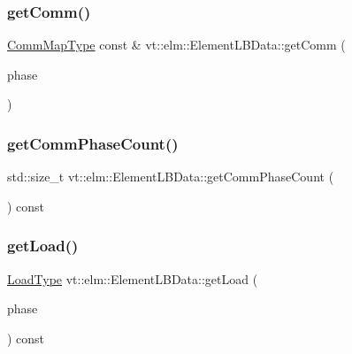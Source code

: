 \subsubsection{\texorpdfstring{get\+Comm()}{getComm()}}
{\footnotesize\ttfamily \hyperlink{namespacevt_1_1elm_a38487cb8896b9b4763efa9022fab560e}{Comm\+Map\+Type} const  \& vt\+::elm\+::\+Element\+L\+B\+Data\+::get\+Comm (\begin{DoxyParamCaption}\item[{\hyperlink{namespacevt_a46ce6733d5cdbd735d561b7b4029f6d7}{Phase\+Type} const \&}]{phase }\end{DoxyParamCaption})}

\mbox{\label{structvt_1_1elm_1_1_element_l_b_data_a5164aaf6b9aa619465454b7d24273f10}} 
\subsubsection{\texorpdfstring{get\+Comm\+Phase\+Count()}{getCommPhaseCount()}}
{\footnotesize\ttfamily std\+::size\+\_\+t vt\+::elm\+::\+Element\+L\+B\+Data\+::get\+Comm\+Phase\+Count (\begin{DoxyParamCaption}{ }\end{DoxyParamCaption}) const}

\mbox{\label{structvt_1_1elm_1_1_element_l_b_data_a839f0515eda6316ee2d6e64bb145e1f4}} 
\subsubsection{\texorpdfstring{get\+Load()}{getLoad()}\hspace{0.1cm}{\footnotesize\ttfamily [1/2]}}
{\footnotesize\ttfamily \hyperlink{namespacevt_a8fb51741340b87d7aaee0bef60e9896b}{Load\+Type} vt\+::elm\+::\+Element\+L\+B\+Data\+::get\+Load (\begin{DoxyParamCaption}\item[{\hyperlink{namespacevt_a46ce6733d5cdbd735d561b7b4029f6d7}{Phase\+Type} const \&}]{phase }\end{DoxyParamCaption}) const}

